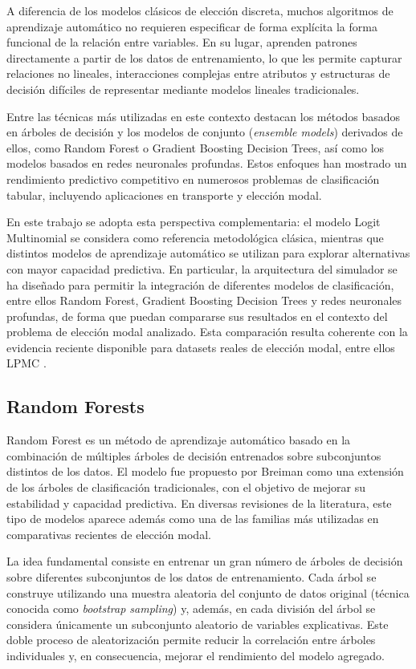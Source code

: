 A diferencia de los modelos clásicos de elección discreta, muchos algoritmos de aprendizaje automático no requieren especificar de forma explícita la forma funcional de la relación entre variables. En su lugar, aprenden patrones directamente a partir de los datos de entrenamiento, lo que les permite capturar relaciones no lineales, interacciones complejas entre atributos y estructuras de decisión difíciles de representar mediante modelos lineales tradicionales.

Entre las técnicas más utilizadas en este contexto destacan los métodos basados en árboles de decisión y los modelos de conjunto (\textit{ensemble models}) derivados de ellos, como Random Forest o Gradient Boosting Decision Trees, así como los modelos basados en redes neuronales profundas. Estos enfoques han mostrado un rendimiento predictivo competitivo en numerosos problemas de clasificación tabular, incluyendo aplicaciones en transporte y elección modal.

En este trabajo se adopta esta perspectiva complementaria: el modelo Logit Multinomial se considera como referencia metodológica clásica, mientras que distintos modelos de aprendizaje automático se utilizan para explorar alternativas con mayor capacidad predictiva. En particular, la arquitectura del simulador se ha diseñado para permitir la integración de diferentes modelos de clasificación, entre ellos Random Forest, Gradient Boosting Decision Trees y redes neuronales profundas, de forma que puedan compararse sus resultados en el contexto del problema de elección modal analizado. Esta comparación resulta coherente con la evidencia reciente disponible para datasets reales de elección modal, entre ellos LPMC \cite{Hillel2018LPMC}.

\subsection{Random Forests}

Random Forest es un método de aprendizaje automático basado en la combinación de múltiples árboles de decisión entrenados sobre subconjuntos distintos de los datos. El modelo fue propuesto por Breiman \cite{Breiman2001} como una extensión de los árboles de clasificación tradicionales, con el objetivo de mejorar su estabilidad y capacidad predictiva. En diversas revisiones de la literatura, este tipo de modelos aparece además como una de las familias más utilizadas en comparativas recientes de elección modal.

La idea fundamental consiste en entrenar un gran número de árboles de decisión sobre diferentes subconjuntos de los datos de entrenamiento. Cada árbol se construye utilizando una muestra aleatoria del conjunto de datos original (técnica conocida como \textit{bootstrap sampling}) y, además, en cada división del árbol se considera únicamente un subconjunto aleatorio de variables explicativas. Este doble proceso de aleatorización permite reducir la correlación entre árboles individuales y, en consecuencia, mejorar el rendimiento del modelo agregado.

